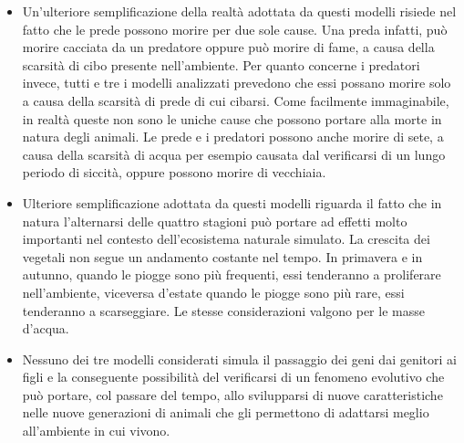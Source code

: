 \documentclass[11pt]{article}
\begin{document}
\begin{itemize}
    \item Un'ulteriore semplificazione della realtà adottata da questi modelli risiede nel fatto che le prede possono morire per due sole cause. Una preda infatti, può morire cacciata da un predatore oppure può morire di fame, a causa della scarsità di cibo presente nell'ambiente. Per quanto concerne i predatori invece, tutti e tre i modelli analizzati prevedono che essi possano morire solo a causa della scarsità di prede di cui cibarsi. Come facilmente immaginabile, in realtà queste non sono le uniche cause che possono portare alla morte in natura degli animali. Le prede e i predatori possono anche morire di sete, a causa della scarsità di acqua per esempio causata dal verificarsi di un lungo periodo di siccità, oppure possono morire di vecchiaia. 
    \item Ulteriore semplificazione adottata da questi modelli riguarda il fatto che in natura l'alternarsi delle quattro stagioni può portare ad effetti molto importanti nel contesto dell'ecosistema naturale simulato. La crescita dei vegetali non segue un andamento costante nel tempo. In primavera e in autunno, quando le piogge sono più frequenti, essi tenderanno a proliferare nell'ambiente, viceversa d'estate quando le piogge sono più rare, essi tenderanno a scarseggiare. Le stesse considerazioni valgono per le masse d'acqua. 
    \item Nessuno dei tre modelli considerati simula il passaggio dei geni dai genitori ai figli e la conseguente possibilità del verificarsi di un fenomeno evolutivo che può portare, col passare del tempo, allo svilupparsi di nuove caratteristiche nelle nuove generazioni di animali che gli permettono di adattarsi meglio all'ambiente in cui vivono.
\end{itemize}
\end{document}

